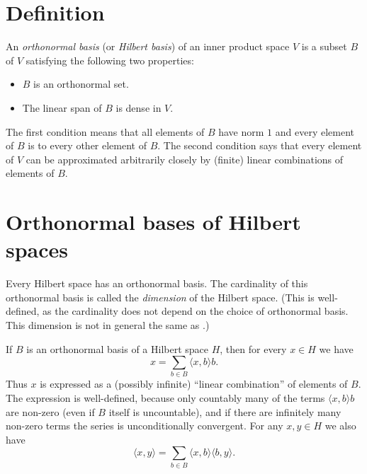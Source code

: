 \documentclass[12pt]{article}
\def\ip#1{{\langle #1\rangle}}
\begin{document}

\section*{Definition}

An \emph{orthonormal basis} (or \emph{Hilbert basis})
of an inner product space $V$
is a subset $B$ of $V$ satisfying the following two properties:
\begin{itemize}
\item $B$ is an orthonormal set.
\item The linear span of $B$ is dense in $V$.
\end{itemize}

The first condition means that all elements of $B$ have norm $1$
and every element of $B$ is  to every other element of $B$.
The second condition says that every element of $V$ can be approximated arbitrarily closely by (finite) linear combinations of elements of $B$.

\section*{Orthonormal bases of Hilbert spaces}

Every Hilbert space has an orthonormal basis.
The cardinality of this orthonormal basis
is called the \emph{dimension} of the Hilbert space.
(This is well-defined,
as the cardinality does not depend on the choice of orthonormal basis.
This dimension is not in general the same as
.)

If $B$ is an orthonormal basis of a Hilbert space $H$,
then for every $x\in H$ we have
\[
  x=\sum_{b\in B}\ip{x,b}b.
\]
Thus $x$ is expressed as a (possibly infinite)
``linear combination'' of elements of $B$.
The expression is well-defined,
because only countably many of the terms $\ip{x,b}b$ are non-zero
(even if $B$ itself is uncountable),
and if there are infinitely many non-zero terms
the series is unconditionally convergent.
For any $x,y\in H$ we also have
\[
  \ip{x,y}=\sum_{b\in B}\ip{x,b}\ip{b,y}.
\]

\end{document}
